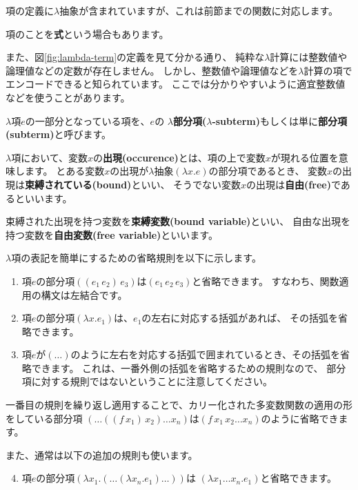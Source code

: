 項の定義に$\lambda$抽象が含まれていますが、これは前節までの関数に対応します。

項のことを\textbf{式}という場合もあります。

また、図\ref{fig:lambda-term}の定義を見て分かる通り、
純粋な$\lambda$計算には整数値や論理値などの定数が存在しません。
しかし、整数値や論理値などを$\lambda$計算の項でエンコードできると知られています。
ここでは分かりやすいように適宜整数値などを使うことがあります。

$\lambda$項$e$の一部分となっている項を、$e$の
\textbf{$\lambda$部分項($\lambda$-subterm)}もしくは単に\textbf{部分項(subterm)}と呼びます。

$\lambda$項において、変数$x$の\textbf{出現(occurence)}とは、項の上で変数$x$が現れる位置を意味します。
とある変数$x$の出現が$\lambda$抽象$(\lambda x . e)$の部分項であるとき、
変数$x$の出現は\textbf{束縛されている(bound)}といい、
そうでない変数$x$の出現は\textbf{自由(free)}であるといいます。

束縛された出現を持つ変数を\textbf{束縛変数(bound variable)}といい、
自由な出現を持つ変数を\textbf{自由変数(free variable)}といいます。

$\lambda$項の表記を簡単にするための省略規則を以下に示します。

\begin{enumerate}
  \item 項$e$の部分項$((e_1 \, e_2) \, e_3)$は$(e_1 \, e_2 \, e_3)$と省略できます。
        すなわち、関数適用の構文は左結合です。
  \item 項$e$の部分項$(\lambda x . e_1)$は、$e_1$の左右に対応する括弧があれば、
        その括弧を省略できます。
  \item 項$e$が$(\dots)$のように左右を対応する括弧で囲まれているとき、その括弧を省略できます。
        これは、一番外側の括弧を省略するための規則なので、
        部分項に対する規則ではないということに注意してください。
\end{enumerate}

一番目の規則を繰り返し適用することで、カリー化された多変数関数の適用の形をしている部分項
$(\dots((f \, x_1) \, x_2) \dots x_n)$は$(f \, x_1 \, x_2 \dots x_n)$のように省略できます。

また、通常は以下の追加の規則も使います。

\begin{enumerate}
  \setcounter{enumi}{3}
  \item 項$e$の部分項$(\lambda x_1. (\dots (\lambda x_n . e_1) \dots))$は
       $(\lambda x_1 \dots x_n . e_1)$と省略できます。
\end{enumerate}

